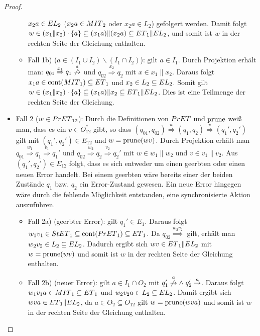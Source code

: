 \begin{proof}
\begin{itemize}
\begin{itemize}
      $x_2a\in EL{}_2$ ($x_2a\in MIT{}_2$ oder $x_2a\in L_2$)
      gefolgert werden. Damit folgt $w\in (x_1\|x_2)\cdot\{a\}\subseteq
      (x_1a)\|(x_2a)\subseteq ET{}_1\|EL{}_2$, und somit ist $w$ in der
      rechten Seite der Gleichung enthalten.
  \item Fall 1b) ($a\in (I_1\cup I_2)\backslash(I_1\cap I_2)$): \OBdA{} gilt
      $a\in I_1$. Durch Projektion erhält man:
      $q_{01}\overset{x_1}{\Rightarrow} q_1
      \overset{a}{\not{\hspace{-0.1cm}\rightarrow}}$ und
      $q_{02}\overset{x_2}{\Rightarrow} q_2$ mit $x\in x_1\|x_2$. Daraus folgt
      $x_1a\in \mathrm{cont}{}(MIT{}_1)\subseteq ET{}_1$ und $x_2\in L_2\subseteq EL{}_2$. Somit
      gilt $w\in (x_1\| x_2)\cdot\{a\}\subseteq (x_1a)\|x_2\subseteq ET{}_1\|EL{}_2$.
      Dies ist eine Teilmenge der rechten Seite der Gleichung.
  \end{itemize}
    \item Fall 2 ($w\in PrET{}_{12}$): Durch die Definitionen von $PrET{}$
      und $\mathrm{prune}{}$ weiß man, dass es ein $v\in O_{12}^*$ gibt, so dass
      $(q_{01},q_{02}) \overset{w}{\Rightarrow} (q_1,q_2)
      \overset{v}{\Rightarrow} (q_1',q_2')$ gilt mit $(q_1',q_2')\in E_{12}$
      und $w=\mathrm{prune}{}(wv)$. Durch Projektion erhält man $q_{01}
      \overset{w_1}{\Rightarrow} q_1 \overset{v_1}{\Rightarrow} q_1'$ und
      $q_{02} \overset{w_2}{\Rightarrow} q_2 \overset{v_2}{\Rightarrow} q_2'$
      mit $w\in w_1\|w_2$ und $v\in v_1\|v_2$. Aus $(q_1',q_2')\in E_{12}$
      folgt, dass es sich entweder um einen geerbten oder einen neuen Error
      handelt. Bei einem geerbten wäre bereits einer der beiden Zustände $q_1$
      bzw. $q_2$ ein Error-Zustand gewesen. Ein neue Error hingegen wäre durch
      die fehlende Möglichkeit entstanden, eine synchronisierte Aktion
      auszuführen.
      \begin{itemize}
        \item Fall 2a) (geerbter Error): \OBdA{} gilt $q_1'\in E_1$. Daraus folgt
          $w_1v_1\in StET{}_1\subseteq \mathrm{cont}{}(PrET{}_1)\subseteq ET{}_1$.
          Da $q_{02}\overset{w_2v_2}{\Longrightarrow}$ gilt, erhält man $w_2v_2\in
          L_2\subseteq EL{}_2$. Dadurch ergibt sich $wv\in ET{}_1\|EL{}_2$ mit
          $w=\mathrm{prune}{}(wv)$ und somit ist $w$ in der rechten Seite der Gleichung
          enthalten.
        \item Fall 2b) (neuer Error): \OBdA{} gilt $a\in I_1\cap O_2$ mit
          $q_1'\overset{a}{\not{\hspace{-0.1cm}\rightarrow}} \wedge \; q_2'
          \overset{a}{\rightarrow}$. Daraus folgt $w_1v_1a\in MIT{}_1\subseteq
          ET{}_1$ und $w_2v_2a\in L_2\subseteq EL{}_2$. Damit ergibt sich $wva\in
          ET{}_1\|EL{}_2$, da $a\in O_2\subseteq O_{12}$ gilt $w=\mathrm{prune}{}(wva)$ und
          somit ist $w$ in der rechten Seite der Gleichung enthalten.
      \end{itemize}
  \end{itemize}


\end{proof}
